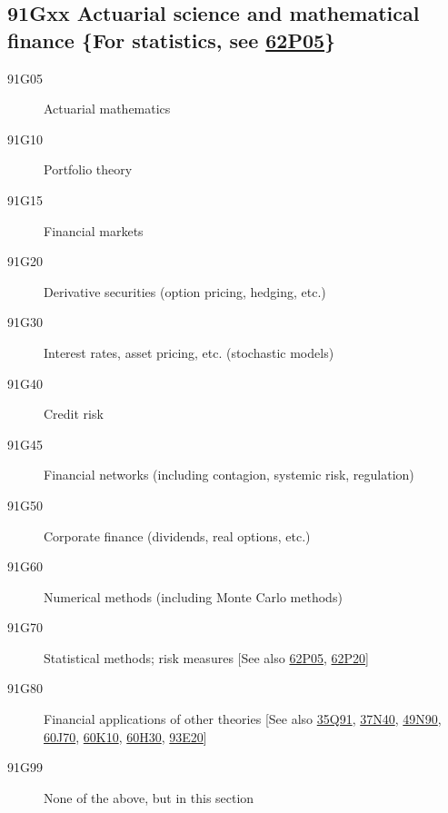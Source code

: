 \documentclass[letterpaper]{article}
\begin{document}
\subsection*{91Gxx  Actuarial science and mathematical finance \{For statistics, see \hyperref[62P05]{62P05}\} }\label{91Gxx}
\begin{description}  
\item [91G05]\label{91G05} Actuarial mathematics
\item [91G10]\label{91G10} Portfolio theory
\item [91G15]\label{91G15} Financial markets
\item [91G20]\label{91G20} Derivative securities (option pricing, hedging, etc.)
\item [91G30]\label{91G30} Interest rates, asset pricing, etc. (stochastic models)
\item [91G40]\label{91G40} Credit risk
\item [91G45]\label{91G45} Financial networks (including contagion, systemic risk, regulation)
\item [91G50]\label{91G50} Corporate finance (dividends, real options, etc.)
\item [91G60]\label{91G60} Numerical methods (including Monte Carlo methods)
\item [91G70]\label{91G70} Statistical methods; risk measures [See also \hyperref[62P05]{62P05}, \hyperref[62P20]{62P20}]
\item [91G80]\label{91G80} Financial applications of other theories [See also \hyperref[35Q91]{35Q91}, \hyperref[37N40]{37N40}, \hyperref[49N90]{49N90}, \hyperref[60J70]{60J70}, \hyperref[60K10]{60K10}, \hyperref[60H30]{60H30}, \hyperref[93E20]{93E20}]
\item [91G99]\label{91G99} None of the above, but in this section
\end{description}
\end{document}
